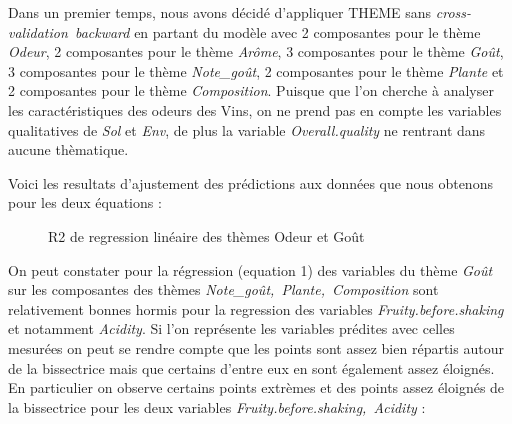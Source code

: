 \documentclass[a4paper,french,10pt]{article}
\begin{document}
Dans un premier temps, nous avons décidé d'appliquer THEME sans \textit{cross-validation~backward} en partant du modèle avec 2 composantes pour le thème \textit{Odeur}, 2 composantes pour le thème \textit{Arôme}, 3 composantes pour le thème \textit{Goût}, 3 composantes pour le thème \textit{Note\_goût}, 2 composantes pour le thème \textit{Plante} et 2 composantes pour le thème \textit{Composition}. Puisque que l'on cherche à analyser les caractéristiques des odeurs des Vins, on ne prend pas en compte les variables qualitatives de \textit{Sol} et \textit{Env}, de plus la variable \textit{Overall.quality} ne rentrant dans aucune thèmatique. \newline

Voici les resultats d'ajustement des prédictions aux données que nous obtenons pour les deux équations : 

\begin{figure}[htp] 
	\centering
	\hfill%
	\caption{R2 de regression linéaire des thèmes Odeur et Goût}
\end{figure}

On peut constater pour la régression (equation 1) des variables du thème \textit{Goût} sur les composantes des thèmes \textit{Note\_goût,~Plante,~Composition} sont relativement bonnes hormis pour la regression des variables \textit{Fruity.before.shaking} et notamment \textit{Acidity}. Si l'on représente les variables prédites avec celles mesurées on peut se rendre compte que les points sont assez bien répartis autour de la bissectrice mais que certains d'entre eux en sont également assez éloignés. En particulier on observe certains points extrèmes et des points assez éloignés de la bissectrice pour les deux variables \textit{Fruity.before.shaking,~Acidity} :
\end{document}
